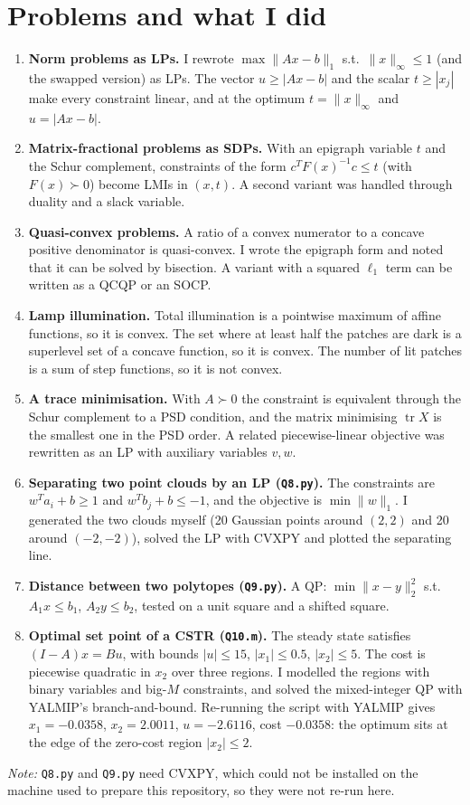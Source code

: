 


\section*{Problems and what I did}
\begin{enumerate}
  \item \textbf{Norm problems as LPs.} I rewrote $\max\|Ax-b\|_1$ s.t.\ $\|x\|_\infty\le 1$ (and the swapped version) as LPs. The vector $u\ge|Ax-b|$ and the scalar $t\ge|x_j|$ make every constraint linear, and at the optimum $t=\|x\|_\infty$ and $u=|Ax-b|$.
  \item \textbf{Matrix-fractional problems as SDPs.} With an epigraph variable $t$ and the Schur complement, constraints of the form $c^TF(x)^{-1}c\le t$ (with $F(x)\succ 0$) become LMIs in $(x,t)$. A second variant was handled through duality and a slack variable.
  \item \textbf{Quasi-convex problems.} A ratio of a convex numerator to a concave positive denominator is quasi-convex. I wrote the epigraph form and noted that it can be solved by bisection. A variant with a squared $\ell_1$ term can be written as a QCQP or an SOCP.
  \item \textbf{Lamp illumination.} Total illumination is a pointwise maximum of affine functions, so it is convex. The set where at least half the patches are dark is a superlevel set of a concave function, so it is convex. The number of lit patches is a sum of step functions, so it is not convex.
  \item \textbf{A trace minimisation.} With $A\succ 0$ the constraint is equivalent through the Schur complement to a PSD condition, and the matrix minimising $\operatorname{tr}X$ is the smallest one in the PSD order. A related piecewise-linear objective was rewritten as an LP with auxiliary variables $v,w$.
  \item \textbf{Separating two point clouds by an LP (\texttt{Q8.py}).} The constraints are $w^Ta_i+b\ge 1$ and $w^Tb_j+b\le-1$, and the objective is $\min\|w\|_1$. I generated the two clouds myself (20 Gaussian points around $(2,2)$ and 20 around $(-2,-2)$), solved the LP with CVXPY and plotted the separating line.
  \item \textbf{Distance between two polytopes (\texttt{Q9.py}).} A QP: $\min\|x-y\|_2^2$ s.t.\ $A_1x\le b_1$, $A_2y\le b_2$, tested on a unit square and a shifted square.
  \item \textbf{Optimal set point of a CSTR (\texttt{Q10.m}).} The steady state satisfies $(I-A)x=Bu$, with bounds $|u|\le 15$, $|x_1|\le 0.5$, $|x_2|\le 5$. The cost is piecewise quadratic in $x_2$ over three regions. I modelled the regions with binary variables and big-$M$ constraints, and solved the mixed-integer QP with YALMIP's branch-and-bound. Re-running the script with YALMIP gives $x_1=-0.0358$, $x_2=2.0011$, $u=-2.6116$, cost $-0.0358$: the optimum sits at the edge of the zero-cost region $|x_2|\le 2$.
\end{enumerate}

\textit{Note:} \texttt{Q8.py} and \texttt{Q9.py} need CVXPY, which could not be installed on the machine used to prepare this repository, so they were not re-run here.

